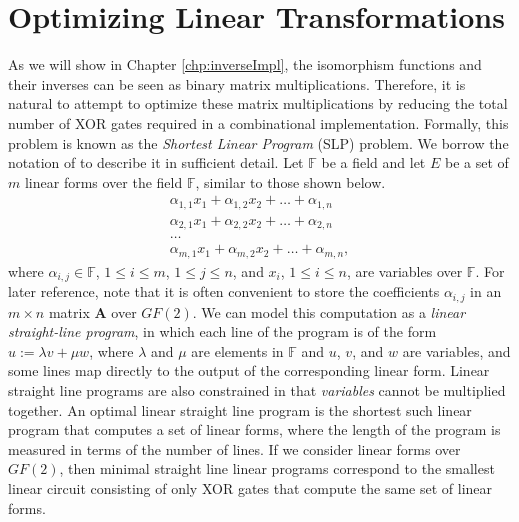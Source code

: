 \section{Optimizing Linear Transformations}
As we will show in Chapter \ref{chp:inverseImpl}, the isomorphism functions and their inverses can be seen as binary matrix multiplications. Therefore, it is natural to attempt to optimize these matrix multiplications by reducing the total number of XOR gates required in a combinational implementation. Formally, this problem is known as the \emph{Shortest Linear Program} (SLP) problem. We borrow the notation of \cite{Boyar08-1} to describe it in sufficient detail. Let $\mathbb{F}$ be a field and let $E$ be a set of $m$ linear forms over the field $\mathbb{F}$, similar to those shown below.
\begin{gather*}
\alpha_{1,1}x_1 + \alpha_{1,2}x_2 + \dots + \alpha_{1,n} \\
\alpha_{2,1}x_1 + \alpha_{2,2}x_2 + \dots + \alpha_{2,n} \\
\dots \\
\alpha_{m,1}x_1 + \alpha_{m,2}x_2 + \dots + \alpha_{m,n},
\end{gather*}
where $\alpha_{i,j} \in \mathbb{F}$, $1 \leq i \leq m$, $1 \leq j \leq n$, and $x_{i}$, $1 \leq i \leq n$, are variables over $\mathbb{F}$. For later reference, note that it is often convenient to store the coefficients $\alpha_{i,j}$ in an $m\times n$ matrix $\mathbf{A}$ over $GF(2)$. We can model this computation as a \emph{linear straight-line program}, in which each line of the program is of the form $u := \lambda v  + \mu w$, where $\lambda$ and $\mu$ are elements in $\mathbb{F}$ and $u$, $v$, and $w$ are variables, and some lines map directly to the output of the corresponding linear form. Linear straight line programs are also constrained in that \emph{variables} cannot be multiplied together. An optimal linear straight line program is the shortest such linear program that computes a set of linear forms, where the length of the program is measured in terms of the number of lines. If we consider linear forms over $GF(2)$, then minimal straight line linear programs correspond to the smallest linear circuit consisting of only XOR gates that compute the same set of linear forms. 

